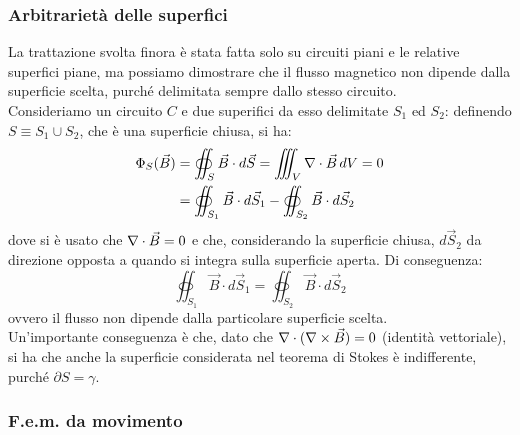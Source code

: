 \subsubsection{Arbitrarietà delle superfici}

La trattazione svolta finora è stata fatta solo su circuiti piani e le relative superfici piane, ma possiamo dimostrare che il flusso magnetico non dipende dalla superficie scelta, purché delimitata sempre dallo stesso circuito. \\ 
%
Consideriamo un circuito $ C $ e due superifici da esso delimitate $ S_1 $ ed $ S_2 $: definendo $ S \equiv S_1 \cup S_2 $, che è una superficie chiusa, si ha:
\begin{equation}
	\begin{split}
		\Phi_S (\vec{B}) &= \oiint_S \vec{B}\cdot d\vec{S} = \iiint_V \nabla\cdot\vec{B} \,dV = 0 \\ 
				 &= \oiint_{S_1} \vec{B}\cdot d\vec{S}_1 - \oiint_{S_2} \vec{B}\cdot d\vec{S}_2
	\end{split}
	\label{eq:6}
\end{equation}
dove si è usato che $ \nabla\cdot\vec{B} = 0 $ e che, considerando la superficie chiusa, $ d\vec{S}_2 $ da direzione opposta a quando si integra sulla superficie aperta. Di conseguenza:
\begin{equation}
	\oiint_{S_1} \vec{B}\cdot d\vec{S}_1 = \oiint_{S_2} \vec{B}\cdot d\vec{S}_2
	\label{eq:7}
\end{equation}
ovvero il flusso non dipende dalla particolare superficie scelta. \\ 
%
Un'importante conseguenza è che, dato che $ \nabla\cdot(\nabla\times\vec{B}) = 0 $ (identità vettoriale), si ha che anche la superficie considerata nel teorema di Stokes è indifferente, purché $ \partial S = \gamma $.

\subsubsection{F.e.m. da movimento}

